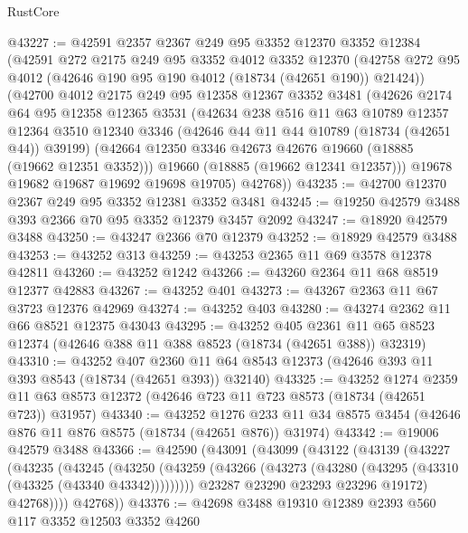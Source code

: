 \begin{lexlean}{RustCore}
\begin{coremodule}
@43227 := @42591
    @2357
    @2367
    @249
    @95
    @3352
    @12370
    @3352
    @12384
    (@42591
      @272
      @2175
      @249
      @95
      @3352
      @4012
      @3352
      @12370
      (@42758 @272 @95 @4012 (@42646 @190 @95 @190 @4012 (@18734 (@42651 @190)) @21424))
      (@42700
        @4012
        @2175
        @249
        @95
        @12358
        @12367
        @3352
        @3481
        (@42626
          @2174
          @64
          @95
          @12358
          @12365
          @3531
          (@42634
            @238
            @516
            @11
            @63
            @10789
            @12357
            @12364
            @3510
            @12340
            @3346
            (@42646 @44 @11 @44 @10789 (@18734 (@42651 @44)) @39199)
            (@42664 @12350 @3346 @42673 @42676 @19660 (@18885 (@19662 @12351 @3352)))
            @19660
            (@18885 (@19662 @12341 @12357)))
          @19678
          @19682
          @19687
          @19692
          @19698
          @19705)
        @42768))
@43235 := @42700 @12370 @2367 @249 @95 @3352 @12381 @3352 @3481
@43245 := @19250 @42579 @3488 @393 @2366 @70 @95 @3352 @12379 @3457 @2092
@43247 := @18920 @42579 @3488
@43250 := @43247 @2366 @70 @12379
@43252 := @18929 @42579 @3488
@43253 := @43252 @313
@43259 := @43253 @2365 @11 @69 @3578 @12378 @42811
@43260 := @43252 @1242
@43266 := @43260 @2364 @11 @68 @8519 @12377 @42883
@43267 := @43252 @401
@43273 := @43267 @2363 @11 @67 @3723 @12376 @42969
@43274 := @43252 @403
@43280 := @43274 @2362 @11 @66 @8521 @12375 @43043
@43295 := @43252
    @405
    @2361
    @11
    @65
    @8523
    @12374
    (@42646 @388 @11 @388 @8523 (@18734 (@42651 @388)) @32319)
@43310 := @43252
    @407
    @2360
    @11
    @64
    @8543
    @12373
    (@42646 @393 @11 @393 @8543 (@18734 (@42651 @393)) @32140)
@43325 := @43252
    @1274
    @2359
    @11
    @63
    @8573
    @12372
    (@42646 @723 @11 @723 @8573 (@18734 (@42651 @723)) @31957)
@43340 := @43252
    @1276
    @233
    @11
    @34
    @8575
    @3454
    (@42646 @876 @11 @876 @8575 (@18734 (@42651 @876)) @31974)
@43342 := @19006 @42579 @3488
@43366 := @42590
    (@43091
      (@43099
        (@43122
          (@43139
            (@43227
              (@43235
                (@43245
                  (@43250
                    (@43259 (@43266 (@43273 (@43280 (@43295 (@43310 (@43325 (@43340 @43342)))))))))
                  @23287
                  @23290
                  @23293
                  @23296
                  @19172)
                @42768))))
        @42768))
@43376 := @42698 @3488 @19310 @12389 @2393 @560 @117 @3352 @12503 @3352 @4260

\end{coremodule}
\end{lexlean}
